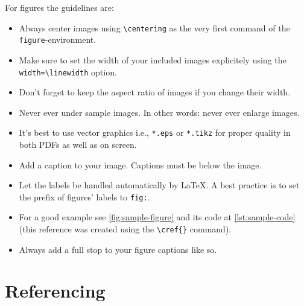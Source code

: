 \documentclass[%
    thesis=ma, %
    language=american, %
    paper=a4,%
    listings,
    online,
    final,
]{isw}
\begin{document}
    
    For figures the guidelines are:
    \begin{itemize}
        \item Always center images using \verb|\centering| as the very first command of the \verb|figure|-environment.
        \item Make sure to set the width of your included images explicitely using the \verb|width=\linewidth| option.
        \item Don't forget to keep the aspect ratio of images if you change their width.
        \item Never ever under sample images. In other words: never ever enlarge images.
        \item It's best to use vector graphics i.e., \verb|*.eps| or \verb|*.tikz| for proper quality in both PDFs as well as on screen.
        \item Add a caption to your image. Captions must be below the image.
        \item Let the labels be handled automatically by \LaTeX. A best practice is to set the prefix of figures' labels to \verb|fig:|.
        \item For a good example see \cref{fig:sample-figure} and its code at \cref{lst:sample-code} (this reference was created using the \verb|\cref{}| command).
        \item Always add a full stop to your figure captions like so.
    \end{itemize}
    
    
    \section{Referencing}
    
\end{document}
